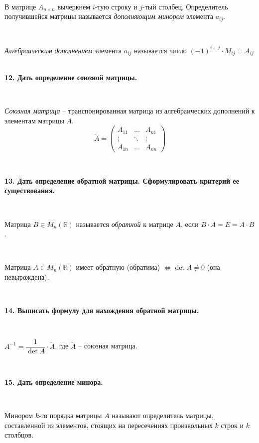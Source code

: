 \documentclass{article}
\begin{document}
	{
		$\;$
		\setlength{\parindent}{0.4cm}
		\hangindent=0.4cm
		
		В матрице $A_{n\times n}$ вычеркнем $i$-тую строку и $j$-тый столбец. Определитель получившейся матрицы называется \textit{дополняющим минором} элемента $a_{ij}$.
		
		$\;$
		
		\textit{Алгебраическим дополнением} элемента $a_{ij}$ называется число $(-1)^{i+j}\cdot M_{ij}=A_{ij}$\\
		
		$\;$
		\setlength{\parindent}{0cm}
		\hangindent=0cm
	}
	
	\textbf{12. Дать определение союзной матрицы.} 
	
	{
		$\;$
		\setlength{\parindent}{0.4cm}
		\hangindent=0.4cm
		
		\textit{Союзная матрица} -- транспонированная матрица из алгебраических	дополнений к элементам матрицы $A$.
		$$\tilde A=\begin{pmatrix}
		A_{11}&\ldots&A_{n1}\\
		\vdots&\ddots&\vdots\\
		A_{1n}&\ldots&A_{nn}
		\end{pmatrix}$$
		
		$\;$
		\setlength{\parindent}{0cm}
		\hangindent=0cm
	}

	\textbf{13. Дать определение обратной матрицы. Сформулировать критерий ее существования.} 
	
	{
		$\;$
		\setlength{\parindent}{0.4cm}
		\hangindent=0.4cm
			
		Матрица $B\in M_n(\mathbb{R})$ называется \textit{обратной} к матрице $A$, если $B\cdot A=E=A\cdot B$.
		
		$\;$
		
		Матрица $A\in M_n(\mathbb{R})$ имеет обратную (обратима) $\Leftrightarrow\det A\ne0$ (она невырождена).
		
		$\;$
		\setlength{\parindent}{0cm}
		\hangindent=0cm
	}
	
	\textbf{14. Выписать формулу для нахождения обратной матрицы.}
	
	{
		$\;$
		\setlength{\parindent}{0.4cm}
		\hangindent=0.4cm
		
		$A^{-1}=\dfrac{1}{\det A}\cdot \tilde A$, где $\tilde A$ -- союзная матрица.
		
		$\;$
		\setlength{\parindent}{0cm}
		\hangindent=0cm
	}
	
	\textbf{15. Дать определение минора.}
	
	{
		$\;$
		\setlength{\parindent}{0.4cm}
		\hangindent=0.4cm
		
		Минором $k$-го порядка матрицы $A$ называют определитель матрицы, составленной из элементов, стоящих на пересечениях произвольных $k$ строк и $k$ столбцов.\\
		
		$\;$
		\setlength{\parindent}{0cm}
		\hangindent=0cm
	}
	
\end{document}
